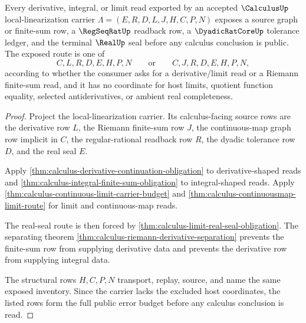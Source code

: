 \begin{theorem}
\label{thm:calculus-real-seal-error-budget}
Every derivative, integral, or limit read exported by an accepted $\CalculusUp$ local-linearization carrier $\Lambda=(E,R,D,L,J,H,C,P,N)$ exposes a source graph or finite-sum row, a $\RegSeqRatUp$ readback row, a $\DyadicRatCoreUp$ tolerance ledger, and the terminal $\RealUp$ seal before any calculus conclusion is public. The exposed route is one of
$$
C,L,R,D,E,H,P,N
\qquad\text{or}\qquad
C,J,R,D,E,H,P,N,
$$
according to whether the consumer asks for a derivative/limit read or a Riemann finite-sum read, and it has no coordinate for host limits, quotient function equality, selected antiderivatives, or ambient real completeness.
\end{theorem}
\begin{proof}
Project the local-linearization carrier. Its calculus-facing source rows are the derivative row $L$, the Riemann finite-sum row $J$, the continuous-map graph row implicit in $C$, the regular-rational readback row $R$, the dyadic tolerance row $D$, and the real seal $E$.

Apply \autoref{thm:calculus-derivative-continuation-obligation} to derivative-shaped reads and \autoref{thm:calculus-integral-finite-sum-obligation} to integral-shaped reads. Apply \autoref{thm:calculus-continuous-limit-carrier-budget} and \autoref{thm:calculus-continuousmap-limit-route} for limit and continuous-map reads.

The real-seal route is then forced by \autoref{thm:calculus-limit-real-seal-obligation}. The separating theorem \autoref{thm:calculus-riemann-derivative-separation} prevents the finite-sum row from supplying derivative data and prevents the derivative row from supplying integral data.

The structural rows $H,C,P,N$ transport, replay, source, and name the same exposed inventory. Since the carrier lacks the excluded host coordinates, the listed rows form the full public error budget before any calculus conclusion is read.
\end{proof}

